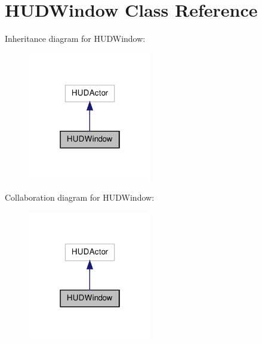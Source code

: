 \hypertarget{class_h_u_d_window}{\section{H\-U\-D\-Window Class Reference}
\label{class_h_u_d_window}
}


Inheritance diagram for H\-U\-D\-Window\-:\nopagebreak
\begin{figure}[H]
\begin{center}
\leavevmode
\includegraphics[width=154pt]{class_h_u_d_window__inherit__graph}
\end{center}
\end{figure}


Collaboration diagram for H\-U\-D\-Window\-:\nopagebreak
\begin{figure}[H]
\begin{center}
\leavevmode
\includegraphics[width=154pt]{class_h_u_d_window__coll__graph}
\end{center}
\end{figure}
